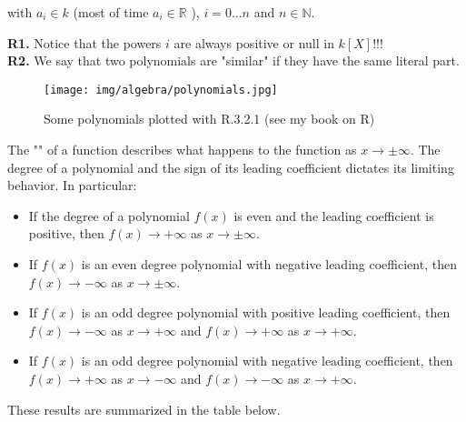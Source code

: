 	with $a_i\in k$ (most of time  $a_i\in \mathbb{R}$ ), $i=0...n$ and $n\in \mathbb{N}$.
	\begin{tcolorbox}[title=Remarks,colframe=black,arc=10pt]
	\textbf{R1.} Notice that the powers $i$ are always positive or null in $k[X]$!!!\\
	
	\textbf{R2.} We say that two polynomials are "similar" if they have the same literal part.
	\end{tcolorbox}
	\begin{figure}[H]
		\centering
		\texttt{[image: img/algebra/polynomials.jpg]}
		\caption[Some polynomials plotted with R.3.2.1]{Some polynomials plotted with R.3.2.1 (see my book on R)}
	\end{figure}
	The "" of a function describes what happens to the function as $x\rightarrow \pm\infty$. The degree of a polynomial and the sign of its leading coefficient dictates its limiting behavior. In particular:
	\begin{itemize}
		\item If the degree of a polynomial $f(x)$ is even and the leading coefficient is positive, then $f(x)\rightarrow +\infty$ as $x\rightarrow \pm\infty$.
		\item If $f(x)$ is an even degree polynomial with negative leading coefficient, then $f(x)\rightarrow -\infty$ as $x\rightarrow \pm\infty$. 
		\item If $f(x)$ is an odd degree polynomial with positive leading coefficient, then $f(x)\rightarrow -\infty$ as $x\rightarrow +\infty$ and $f(x)\rightarrow +\infty$ as $x\rightarrow +\infty$.
 
		\item If $f(x)$ is an odd degree polynomial with negative leading coefficient, then $f(x)\rightarrow +\infty$ as $x\rightarrow -\infty$ and $f(x)\rightarrow -\infty$ as $x\rightarrow +\infty$.
	\end{itemize}
	These results are summarized in the table below.
	
